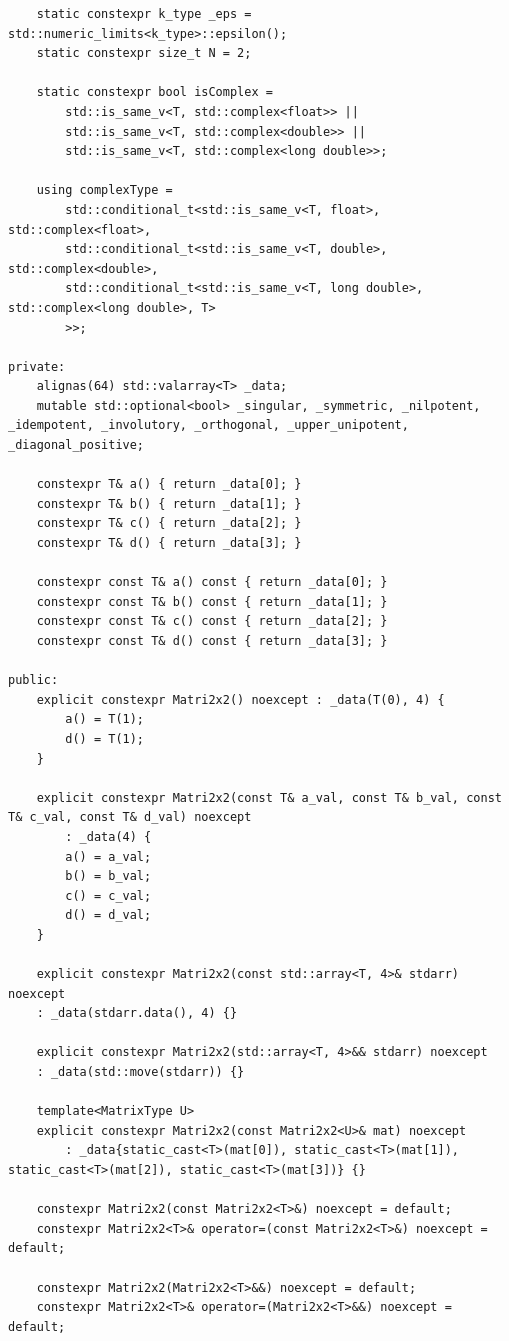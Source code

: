 \documentclass[11pt]{article}
\begin{document}
\begin{lstlisting}
    static constexpr k_type _eps = std::numeric_limits<k_type>::epsilon();
    static constexpr size_t N = 2;
    
    static constexpr bool isComplex = 
        std::is_same_v<T, std::complex<float>> ||
        std::is_same_v<T, std::complex<double>> ||
        std::is_same_v<T, std::complex<long double>>;

    using complexType =
        std::conditional_t<std::is_same_v<T, float>, std::complex<float>,
        std::conditional_t<std::is_same_v<T, double>, std::complex<double>,
        std::conditional_t<std::is_same_v<T, long double>,  std::complex<long double>, T>
        >>;

private:
    alignas(64) std::valarray<T> _data;
    mutable std::optional<bool> _singular, _symmetric, _nilpotent, _idempotent, _involutory, _orthogonal, _upper_unipotent, _diagonal_positive;

    constexpr T& a() { return _data[0]; }
    constexpr T& b() { return _data[1]; }
    constexpr T& c() { return _data[2]; }
    constexpr T& d() { return _data[3]; }
    
    constexpr const T& a() const { return _data[0]; }
    constexpr const T& b() const { return _data[1]; }
    constexpr const T& c() const { return _data[2]; }
    constexpr const T& d() const { return _data[3]; }

public:
    explicit constexpr Matri2x2() noexcept : _data(T(0), 4) {
        a() = T(1);
        d() = T(1);
    }
    
    explicit constexpr Matri2x2(const T& a_val, const T& b_val, const T& c_val, const T& d_val) noexcept 
        : _data(4) {
        a() = a_val;
        b() = b_val;
        c() = c_val;
        d() = d_val;
    }

    explicit constexpr Matri2x2(const std::array<T, 4>& stdarr) noexcept
    : _data(stdarr.data(), 4) {}

    explicit constexpr Matri2x2(std::array<T, 4>&& stdarr) noexcept
    : _data(std::move(stdarr)) {}

    template<MatrixType U>
    explicit constexpr Matri2x2(const Matri2x2<U>& mat) noexcept
        : _data{static_cast<T>(mat[0]), static_cast<T>(mat[1]), static_cast<T>(mat[2]), static_cast<T>(mat[3])} {}

    constexpr Matri2x2(const Matri2x2<T>&) noexcept = default;
    constexpr Matri2x2<T>& operator=(const Matri2x2<T>&) noexcept = default;

    constexpr Matri2x2(Matri2x2<T>&&) noexcept = default;
    constexpr Matri2x2<T>& operator=(Matri2x2<T>&&) noexcept = default;


\end{lstlisting}
\end{document}
